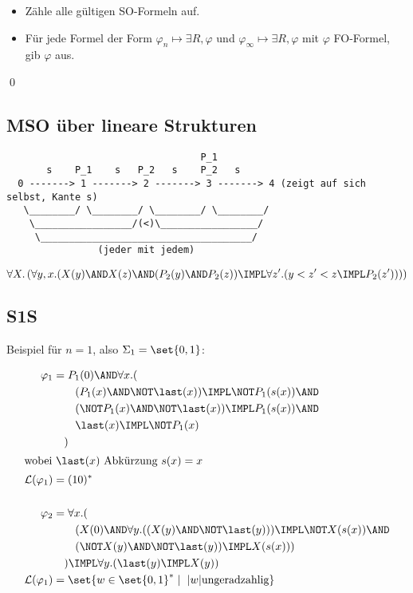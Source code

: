 \begin{itemize}
  \item Zähle alle gültigen SO-Formeln auf.
  \item Für jede Formel der Form $\varphi_n\mapsto\exists R,\varphi$ und
  $\varphi_\infty\mapsto\exists R,\varphi$ mit $\varphi$ FO-Formel, gib
  $\varphi$ aus.
\end{itemize}
\qed

\subsection{MSO über lineare Strukturen}

\begin{verbatim}
                                  P_1
       s    P_1    s   P_2   s    P_2   s
  0 -------> 1 -------> 2 -------> 3 -------> 4 (zeigt auf sich selbst, Kante s)
   \________/ \________/ \________/ \________/
    \_________________/(<)\_________________/
     \_____________________________________/
                (jeder mit jedem)
\end{verbatim}

\[
  \forall X.\left(\forall y,x. (X(y) \AND X(z) \AND (P_2(y) \AND P_2(z)) \IMPL
    \forall z'.(y<z'<z \IMPL P_2(z'))) \right)
\]

\subsection{S1S}

Beispiel für $n=1$, also $\Sigma_1=\set{0,1}$:

\begin{align*}
  \varphi_1 &= P_1(0) \AND \forall x.(\\
    &\qquad (P_1(x) \AND \NOT\last(x)) \IMPL \NOT P_1(s(x)) \AND\\
    &\qquad (\NOT P_1(x) \AND \NOT\last(x)) \IMPL P_1(s(x)) \AND\\
    &\qquad \last(x) \IMPL \NOT P_1(x)\\
  &\quad)\\
  \intertext{wobei $\last(x)$ Abkürzung $s(x)=x$}
  \mathcal{L}(\varphi_1) &= (10)^*\\[\baselineskip]
  \varphi_2 &= \forall x.(\\
    &\qquad (X(0) \AND \forall y.((X(y) \AND \NOT\last(y)))\IMPL \NOT X(s(x)) \AND\\
    &\qquad (\NOT X(y) \AND \NOT \last(y)) \IMPL X(s(x)))\\
  &\quad) \IMPL \forall y.(\last(y)\IMPL X(y)) \\
  \mathcal{L}(\varphi_1) &= \set{w\in\set{0,1}^*\mid~|w| \text{ungeradzahlig}}
\end{align*}

